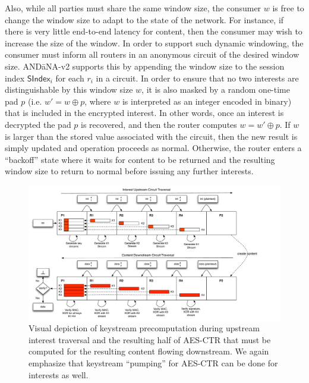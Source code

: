 \documentclass[10pt]{article}
\begin{document}
Also, while all parties must share the same window size, the consumer $w$ is free to change the window size to adapt to the state of the network. For instance, if there is very little end-to-end latency for content, then the consumer may wish to increase the size of the window. In order to support such dynamic windowing, the consumer must inform all routers in an anonymous circuit of the desired window size. {\sf AND\=aNA-v2} supports this by appending the window size to the session index $\mathsf{SIndex}_i$ for each $r_i$ in a circuit. In order to ensure that no two interests are distinguishable by this window size $w$, it is also masked by a random one-time pad $p$ (i.e. $w' = w \oplus p$, where $w$ is interpreted as an integer encoded in binary) that is included in the encrypted interest. In other words, once an interest is decrypted the pad $p$ is recovered, and then the router computes $w = w' \oplus p$. If $w$ is larger than the stored value associated with the circuit, then the new result is simply updated and operation proceeds as normal. Otherwise, the router enters a ``backoff'' state where it waits for content to be returned and the resulting window size to return to normal before issuing any further interests.

\begin{figure}[ht!]
\begin{center}
\includegraphics[scale=0.45]{./images/ctr_split.pdf}
\end{center}
\caption{Visual depiction of keystream precomputation during upstream interest traversal and the resulting half of AES-CTR that must be computed for the resulting content flowing downstream. We again emphasize that keystream ``pumping'' for AES-CTR can be done for interests as well.}
\label{fig:circuit}
\end{figure}
\end{document}

